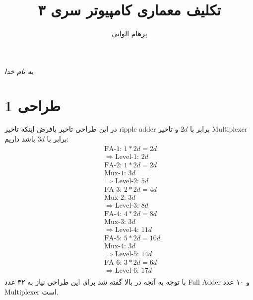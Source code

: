 \documentclass[11pt]{article}
\author{پرهام الوانی}
\title{تکلیف معماری کامپیوتر سری ۳}
\begin{document}
\begin{titlepage}
\begin{center}
\emph{به نام خدا}
\end{center}
\maketitle
\begin{center}
\end{center}
\end{titlepage}
\tableofcontents
\newpage
\section{طراحی 1}
در این طراحی تاخیر بافرض اینکه تاخیر ripple adder برابر با $2d$ و تاخیر Multiplexer برابر با $3d$ باشد داریم:
\begin{align*}
	&\text{FA-1: } 1 * 2d = 2d \\
	&\Longrightarrow \text{Level-1: } 2d \\
	&\text{FA-2: } 1 * 2d = 2d \\
	&\text{Mux-1: } 3d \\
	&\Longrightarrow \text{Level-2: } 5d \\
	&\text{FA-3: } 2 * 2d = 4d \\
	&\text{Mux-2: } 3d\\
	&\Longrightarrow \text{Level-3: } 8d \\
	&\text{FA-4: } 4 * 2d = 8d \\
	&\text{Mux-3: } 3d\\
	&\Longrightarrow \text{Level-4: } 11d \\
	&\text{FA-5: } 5 * 2d = 10d \\
	&\text{Mux-4: } 3d \\
	&\Longrightarrow \text{Level-5: } 14d \\
	&\text{FA-6: } 3 * 2d = 6d \\
	&\Longrightarrow \text{Level-6: } 17d \\
\end{align*}
با توجه به آنجه در بالا گفته شد برای این طراحی نیاز به ۳۲ عدد Full Adder و ۱۰ عدد Multiplexer است.
\end{document}
